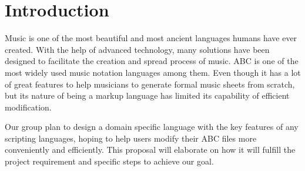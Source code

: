 \section{Introduction}

Music is one of the most beautiful and most ancient languages humans have ever created. With the help of advanced technology, many solutions have been designed to facilitate the creation and spread process of music. ABC is one of the most widely used music notation languages among them. Even though it has a lot of great features to help musicians to generate formal music sheets from scratch, but its nature of being a markup language has limited its capability of efficient modification.

Our group plan to design a domain specific language with the key features of any scripting languages, hoping to help users modify their ABC files more conveniently and efficiently. This proposal will elaborate on how it will fulfill the project requirement and specific steps to achieve our goal.
